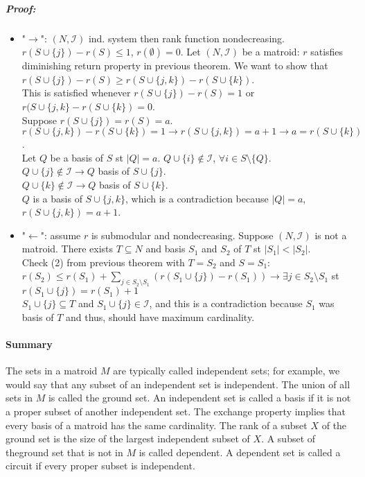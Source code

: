 \documentclass[main]{subfiles}
\begin{document}
\subparagraph{Proof:}
\begin{itemize}
\itemsep0em
\item "$\rightarrow$": $(N,\mathcal{I})$ ind. system then rank function 
nondecreasing.
\subitem $r(S \cup \{j\}) - r(S) \leq 1$, $r(\emptyset) = 0$. Let
$(N,\mathcal{I})$ be a matroid: $r$ satisfies diminishing return property in
previous theorem. We want to show that $r(S \cup \{j\}) - r(S) \geq  r(S \cup
\{j,k\}) - r(S \cup \{k\})$.\\
This is satisfied whenever $r(S \cup \{j\}) - r(S) = 1$ or $r(S \cup \{j,k\}
- r(S \cup \{k\}) = 0$.\\
Suppose $r(S \cup \{j\}) = r(S) = a$. $r(S \cup \{j,k\}) - r(S \cup \{k\}) = 1
\rightarrow r(S \cup \{j,k\}) = a+ 1 \rightarrow a = r(S \cup \{k\})$.\\
Let $Q$ be a basis of $S$ st $|Q| = a$. $Q \cup \{i\} \notin \mathcal{I}$,
$\forall i \in S\setminus \{Q\}$.\\
$Q \cup \{j\} \notin \mathcal{I} \rightarrow Q$ basis of $S \cup \{j\}$.\\
$Q \cup \{k\} \notin \mathcal{I} \rightarrow Q$ basis of $S \cup \{k\}$.\\
$Q$ is a basis of $S \cup \{j,k\}$, which is a contradiction because $|Q| = a$,
$r(S \cup \{j,k\}) = a+1$.
\item "$\leftarrow$": assume $r$ is submodular and nondecreasing.
\subitem Suppose $(N,\mathcal{I})$ is not a matroid. There exists $T \subseteq
N$ and basis $S_1$ and $S_2$ of $T$ st $|S_1| < |S_2|$.\\
Check (2) from previous theorem with $T = S_2$ and $S = S_1$:\\
$r(S_2) \leq r(S_1) + \sum_{j \in S_2 \setminus S_1}( r(S_1 \cup \{j\}) -
r(S_1)) \rightarrow \exists j \in S_2 \setminus S_1$ st $r(S_1 \cup \{j\}) =
r(S_1) + 1$\\
$S_1 \cup \{j\} \subseteq T$ and $S_1 \cup \{j\} \in \mathcal{I}$, and this is
a contradiction because $S_1$ was basis of $T$ and thus, should have maximum
cardinality.
\end{itemize}

\paragraph{Summary}
The sets in a matroid $M$ are typically called independent sets; for example,
we would say that any subset of an independent set is independent. The union of
all sets in $M$ is called the ground set. An independent set is called a basis
if it is not a proper subset of another independent set. The exchange property
implies that every basis of a matroid has the same cardinality. The rank of
a subset $X$ of the ground set is the size of the largest independent subset of 
$X$. A subset of theground set that is not in $M$ is called dependent. A
dependent set is called a circuit if every proper subset is independent.
\end{document}
